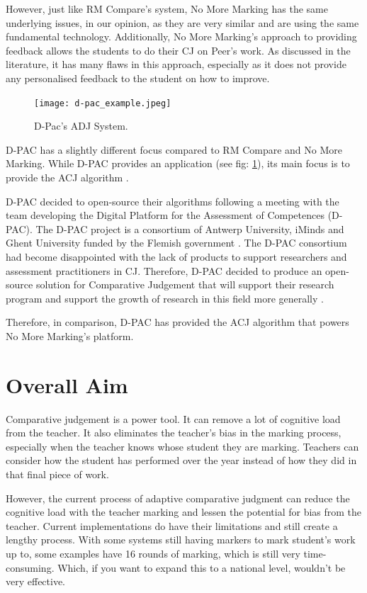 		However, just like RM Compare's system, No More Marking has the same underlying issues, in our opinion, as they are very similar and are using the same fundamental technology. Additionally, No More Marking's approach to providing feedback allows the students to do their CJ on Peer's work. As discussed in the literature, it has many flaws in this approach, especially as it does not provide any personalised feedback to the student on how to improve.  
	
	
		\begin{figure}[t]
			\centering
			\texttt{[image: d-pac\_example.jpeg]}
			\caption{D-Pac's ADJ System.}
			\label{fig:d-pac_ex}
			
		\end{figure}
	
		D-PAC has a slightly different focus compared to RM Compare and No More Marking. While D-PAC provides an application (see fig: \ref{fig:d-pac_ex}), its main focus is to provide the ACJ algorithm \cite{d-pac_blog,d-pac_gh}.
		
		D-PAC decided to open-source their algorithms following a meeting with the team developing the Digital Platform for the Assessment of Competences (D-PAC). The D-PAC project is a consortium of Antwerp University, iMinds and Ghent University funded by the Flemish government \cite{d-pac_blog}. The D-PAC consortium had become disappointed with the lack of products to support researchers and assessment practitioners in CJ. Therefore, D-PAC decided to produce an open-source solution for Comparative Judgement that will support their research program and support the growth of research in this field more generally \cite{d-pac_blog}.
		
		Therefore, in comparison, D-PAC has provided the ACJ algorithm that powers No More Marking's platform.

	
	\section{Overall Aim}
		Comparative judgement is a power tool. It can remove a lot of cognitive load from the teacher. It also eliminates the teacher's bias in the marking process, especially when the teacher knows whose student they are marking. Teachers can consider how the student has performed over the year instead of how they did in that final piece of work.
		
		However, the current process of adaptive comparative judgment can reduce the cognitive load with the teacher marking and lessen the potential for bias from the teacher. Current implementations do have their limitations and still create a lengthy process. With some systems still having markers to mark student's work up to, some examples have 16 rounds of marking, which is still very time-consuming. Which, if you want to expand this to a national level, wouldn't be very effective.
		
